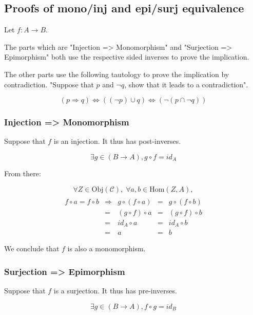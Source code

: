 \documentclass[12pt, letterpaper, twoside]{report}
\begin{document}
\subsection*{Proofs of mono/inj and epi/surj equivalence}

Let $f : A \to B$.

The parts which are "Injection => Monomorphism" and "Surjection => Epimorphism" both use the respective sided inverses to prove the implication.

The other parts use the following tautology to prove the implication by contradiction. "Suppose that $p$ and $\neg q$, show that it leads to a contradiction".

$$
(p \Rightarrow q)
\Leftrightarrow ((\neg  p) \cup      q )
\Leftrightarrow ( \neg (p  \cap \neg q))
$$


\subsubsection*{Injection => Monomorphism}

Suppose that $f$ is an injection. It thus has post-inverses.

$$\exists g \in (B \to A), g \circ f = id_A$$

From there:

$$
\forall Z \in \text{Obj}(\mathcal{C}), \;
\forall a, b \in \text{Hom}(Z, A),
$$
$$
\begin{array}{ccccc} \\
f \circ a = f \circ b & \Rightarrow &  g \circ (f  \circ a) &=&  g \circ (f  \circ b) \\
                      & =           & (g \circ  f) \circ a  &=& (g \circ  f) \circ b  \\
                      & =           &         id_A \circ a  &=&         id_A \circ b  \\
                      & =           &                    a  &=&                    b
\end{array}
$$

We conclude that $f$ is also a monomorphism.


\subsubsection*{Surjection => Epimorphism}

Suppose that $f$ is a surjection. It thus has pre-inverses.

$$\exists g \in (B \to A), f \circ g = id_B$$
\end{document}

